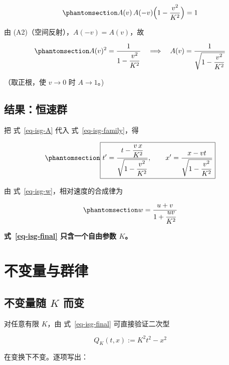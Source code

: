 \documentclass[
  chinese,
  a4paper,
  UTF8,
  12pt,
  oneside,
  openany]{ctexbook}
\theoremstyle{plain}
\theoremstyle{plain}
\theoremstyle{plain}
\theoremstyle{definition}
\theoremstyle{plain}
\theoremstyle{plain}
\theoremstyle{remark}
\begin{document}
\begin{equation}\protect\phantomsection\label{eq-isg-func2}{
A(v)\,A(-v)\Bigl(1-\frac{v^{2}}{K^{2}}\Bigr)=1
}\end{equation}

由 (A2)（空间反射），\(A(-v)=A(v)\)，故

\begin{equation}\protect\phantomsection\label{eq-isg-A}{
A(v)^{2}=\frac{1}{1-\dfrac{v^{2}}{K^{2}}}
\quad\Longrightarrow\quad
A(v)=\frac{1}{\sqrt{1-\dfrac{v^{2}}{K^{2}}}}
}\end{equation}

（取正根，使 \(v\to0\) 时 \(A\to1\)。)

\subsection{结果：恒速群}\label{ux7ed3ux679cux6052ux901fux7fa4}

把 式~\ref{eq-isg-A} 代入 式~\ref{eq-isg-family}，得

\begin{equation}\protect\phantomsection\label{eq-isg-final}{
\boxed{
t'=\frac{t-\dfrac{v\,x}{K^{2}}}{\sqrt{1-\dfrac{v^{2}}{K^{2}}}},\qquad
x'=\frac{x-vt}{\sqrt{1-\dfrac{v^{2}}{K^{2}}}}}
}\end{equation}

由 式~\ref{eq-isg-w}，相对速度的合成律为

\begin{equation}\protect\phantomsection\label{eq-isg-composition}{
w=\frac{u+v}{1+\dfrac{uv}{K^{2}}}
}\end{equation}

\textbf{式~\ref{eq-isg-final} 只含一个自由参数 \(K\)。}

\section{不变量与群律}\label{sec-isg-invariants}

\subsection{\texorpdfstring{不变量随 \(K\)
而变}{不变量随 K 而变}}\label{ux4e0dux53d8ux91cfux968f-k-ux800cux53d8}

对任意有限 \(K\)，由 式~\ref{eq-isg-final} 可直接验证二次型

\[
Q_K(t,x):=K^{2}t^{2}-x^{2}
\]

在变换下不变。逐项写出：
\end{document}
